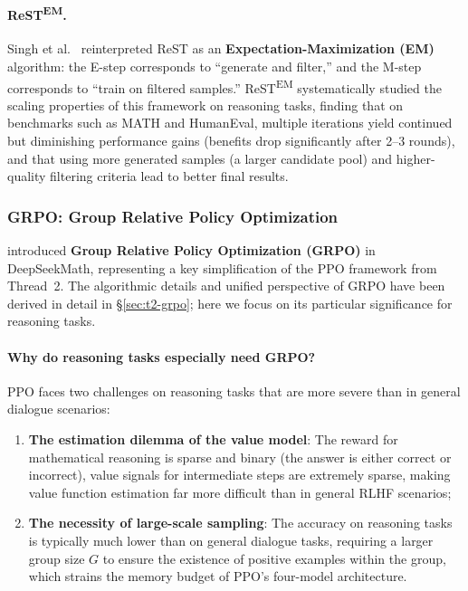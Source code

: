 \paragraph{ReST\textsuperscript{EM}.}
Singh et al.\ \cite{singh2024restem} reinterpreted ReST as an
\textbf{Expectation-Maximization (EM)} algorithm:
the E-step corresponds to ``generate and filter,'' and the M-step corresponds to ``train on filtered samples.''
ReST\textsuperscript{EM} systematically studied the scaling properties of this framework on reasoning tasks,
finding that on benchmarks such as MATH and HumanEval,
multiple iterations yield continued but diminishing performance gains (benefits drop significantly after 2--3 rounds),
and that using more generated samples (a larger candidate pool) and higher-quality filtering criteria lead to better final results.

\subsubsection{GRPO: Group Relative Policy Optimization}
\label{sec:t4-grpo}

 introduced
\textbf{Group Relative Policy Optimization (GRPO)} in DeepSeekMath,
representing a key simplification of the PPO framework from Thread~2.
The algorithmic details and unified perspective of GRPO have been derived in detail in \S\ref{sec:t2-grpo};
here we focus on its particular significance for reasoning tasks.

\paragraph{Why do reasoning tasks especially need GRPO?}
PPO faces two challenges on reasoning tasks that are more severe than in general dialogue scenarios:
\begin{enumerate}[leftmargin=2em]
  \item \textbf{The estimation dilemma of the value model}:
    The reward for mathematical reasoning is sparse and binary (the answer is either correct or incorrect),
    value signals for intermediate steps are extremely sparse,
    making value function estimation far more difficult than in general RLHF scenarios;
  \item \textbf{The necessity of large-scale sampling}:
    The accuracy on reasoning tasks is typically much lower than on general dialogue tasks,
    requiring a larger group size $G$ to ensure the existence of positive examples within the group,
    which strains the memory budget of PPO's four-model architecture.
\end{enumerate}

